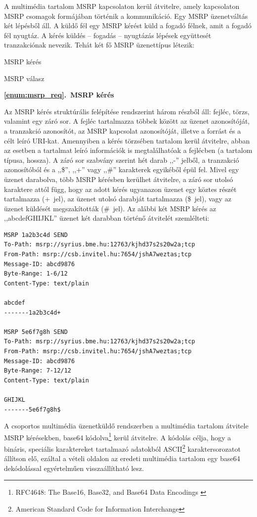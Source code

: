 A multimédia tartalom MSRP kapcsolaton kerül átvitelre, amely kapcsolaton MSRP csomagok formájában történik a kommunikáció. Egy MSRP üzenetváltás két lépésből áll. A küldő fél egy MSRP kérést küld a fogadó félnek, amit a fogadó fél nyugtáz. A kérés küldés -- fogadás -- nyugtázás lépések együttesét tranzakciónak nevezik. Tehát két fő MSRP üzenettípus létezik:
\begin{myenumerate}
\item \label{enum:msrp_req} MSRP kérés
\item \label{enum:msrp_resp} MSRP válasz
\end{myenumerate}
\bigskip

\noindent
{\bf \ref{enum:msrp_req}.~MSRP kérés}

Az MSRP kérés struktúrális felépítése rendszerint három részből áll: fejléc, törzs, valamint egy záró sor. A fejléc tartalmazza többek között az üzenet azonosítóját, a tranzakció azonosítót, az MSRP kapcsolat azonosítóját, illetve a forrást és a célt leíró URI-kat. Amennyiben a kérés törzsében tartalom kerül átvitelre, abban az esetben a tartalmat leíró információk is megtalálhatóak a fejlécben (a tartalom típusa, hossza). A záró sor szabvány szerint hét darab ,,-'' jelből, a tranzakció azonosítóból és a ,,\$'', ,,+'' vagy ,,\#'' karakterek egyikéből épül fel. Mivel egy üzenet darabolva, több MSRP kérésben kerülhet átvitelre, a záró sor utolsó karaktere attól függ, hogy az adott kérés ugyanazon üzenet egy köztes részét tartalmazza (+~jel), az üzenet utolsó darabját tartalmazza (\$~jel), vagy az üzenet küldését megszakították (\#~jel). Az alábbi két MSRP kérés az ,,abcdefGHIJKL'' üzenet két darabban történő átvitelét szemlélteti:

\fontsize{10}{10}
\begin{verbatim}
MSRP 1a2b3c4d SEND
To-Path: msrp://syrius.bme.hu:12763/kjhd37s2s20w2a;tcp
From-Path: msrp://csb.invitel.hu:7654/jshA7weztas;tcp
Message-ID: abcd9876
Byte-Range: 1-6/12
Content-Type: text/plain

abcdef
-------1a2b3c4d+

MSRP 5e6f7g8h SEND
To-Path: msrp://syrius.bme.hu:12763/kjhd37s2s20w2a;tcp
From-Path: msrp://csb.invitel.hu:7654/jshA7weztas;tcp
Message-ID: abcd9876
Byte-Range: 7-12/12
Content-Type: text/plain

GHIJKL
-------5e6f7g8h$
\end{verbatim}
\fontsize{12}{12} 

A csoportos multimédia üzenetküldő rendszerben a multimédia tartalom átvitele MSRP kérésekben, base64 kódolva\footnote{RFC4648: The Base16, Base32, and Base64 Data Encodings \cite{rfc4648}} kerül átvitelre. A kódolás célja, hogy a bináris, speciális karaktereket tartalmazó adatokból ASCII\footnote{American Standard Code for Information Interchange} karaktersorozatot állítson elő, ezáltal a vételi oldalon az eredeti multimédia tartalom egy base64 dekódolással egyértelműen visszaállítható lesz.
\bigskip

